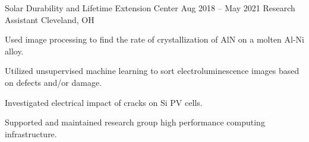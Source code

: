 \documentclass[10pt]{article}
\begin{document}
{    
\vspace{0.25cm}
	\job
	{Solar Durability and Lifetime Extension Center}
	{Aug 2018 – May 2021}
	{Research Assistant}
	{Cleveland, OH}
	\
	
	{\begin{newitemize}

		\item Used image processing to find the rate of crystallization of AlN on a molten Al-Ni alloy.
		\item Utilized unsupervised machine learning to sort electroluminescence images based on defects and/or damage.
		\item Investigated electrical impact of cracks on Si PV cells.
		\item Supported and maintained research group high performance computing infrastructure. 
	
		\end{newitemize}}
%	
	
}	
\end{document}
